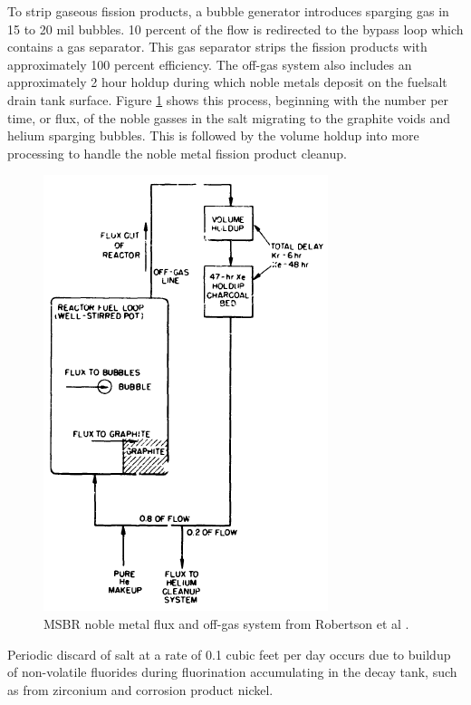 To strip gaseous fission products, a bubble generator introduces sparging gas in 15 to 20 mil bubbles. 10 percent of the flow is redirected to the bypass loop which contains a gas separator. This gas separator strips the fission products with approximately 100 percent efficiency. The off-gas system also includes an approximately 2 hour holdup during which noble metals deposit on the fuelsalt drain tank surface. Figure \ref{fig:msbr_nm_pa} shows this process, beginning with the number per time, or flux, of the noble gasses in the salt migrating to the graphite voids and helium sparging bubbles. This is followed by the volume holdup into more processing to handle the noble metal fission product cleanup.

\begin{figure}[H]
  \centering
  \includegraphics[scale=0.65]{images/msbr_nm_robertson.PNG}
  \caption{MSBR noble metal flux and off-gas system from Robertson et al \cite{robertson_conceptual_1971}.}
   \label{fig:msbr_nm_pa}
\end{figure}

Periodic discard of salt at a rate of 0.1 cubic feet per day occurs due to buildup of non-volatile fluorides during fluorination accumulating in the decay tank, such as from zirconium and corrosion product nickel.



